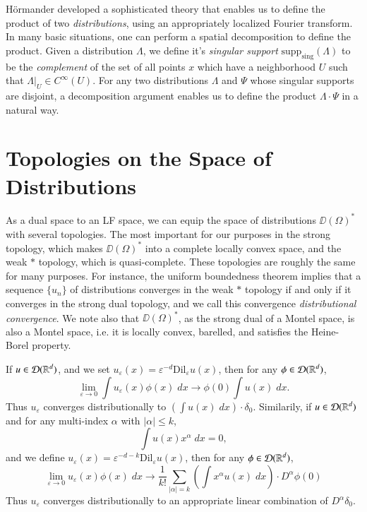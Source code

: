 \begin{remark}
    H\"{o}rmander developed a sophisticated theory that enables us to define the product of two \emph{distributions},  using an appropriately localized Fourier transform. In many basic situations, one can perform a spatial decomposition to define the product. Given a distribution $\Lambda$, we define it's \emph{singular support} $\text{supp}_{\text{sing}}(\Lambda)$ to be the \emph{complement} of the set of all points $x$ which have a neighborhood $U$ such that $\Lambda|_U \in C^\infty(U)$. For any two distributions $\Lambda$ and $\Psi$ whose singular supports are disjoint, a decomposition argument enables us to define the product $\Lambda \cdot \Psi$ in a natural way.
\end{remark}

\section{Topologies on the Space of Distributions}

As a dual space to an LF space, we can equip the space of distributions $\DD(\Omega)^*$ with several topologies. The most important for our purposes in the strong topology, which makes $\DD(\Omega)^*$ into a complete locally convex space, and the weak $*$ topology, which is quasi-complete. These topologies are roughly the same for many purposes. For instance, the uniform boundedness theorem implies that a sequence $\{ u_n \}$ of distributions converges in the weak $*$ topology if and only if it converges in the strong dual topology, and we call this convergence \emph{distributional convergence}. We note also that $\DD(\Omega)^*$, as the strong dual of a Montel space, is also a Montel space, i.e. it is locally convex, barelled, and satisfies the Heine-Borel property.

\begin{example}
    If $u \in \operatorname{\mathcal{D}}(\operatorname{\mathbb{R}}^d)$, and we set $u_\varepsilon(x) = \varepsilon^{-d} \text{Dil}_\varepsilon u(x)$, then for any $\phi \in \operatorname{\mathcal{D}}(\operatorname{\mathbb{R}}^d)$,
    \[ \lim_{\varepsilon \to 0} \int u_\varepsilon(x) \phi(x)\; dx \to \phi(0) \int u(x)\; dx. \]
    Thus $u_\varepsilon$ converges distributionally to $(\int u(x)\; dx) \cdot \delta_0$. Similarily, if $u \in \operatorname{\mathcal{D}}(\operatorname{\mathbb{R}}^d)$ and for any multi-index $\alpha$ with $|\alpha| \leq k$,
    \[ \int u(x) x^\alpha\; dx = 0, \]
    and we define $u_\varepsilon(x) = \varepsilon^{-d-k} \text{Dil}_\varepsilon u(x)$, then for any $\phi \in \operatorname{\mathcal{D}}(\operatorname{\mathbb{R}}^d)$,
    \[ \lim_{\varepsilon \to 0} u_\varepsilon(x) \phi(x)\; dx \to \frac{1}{k!} \sum_{|\alpha| = k} \left( \int x^\alpha u(x)\; dx \right) \cdot D^\alpha \phi(0) \]
    Thus $u_\varepsilon$ converges distributionally to an appropriate linear combination of $D^\alpha \delta_0$.
\end{example}

